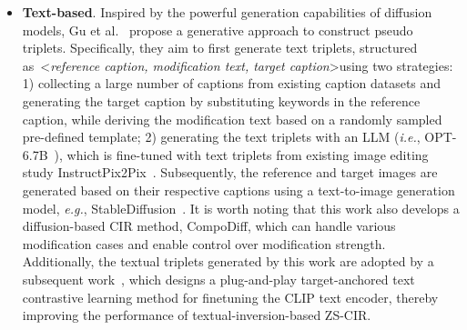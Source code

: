 \begin{itemize}
Instead of relying on visual similarity, MagicLens~\cite{zhang2024magiclens} extracts potential reference-target image pairs by mining images from the same webpage, where implicit relationships often exist. It annotates each image with detailed descriptions, including Alt-texts\footnote{https://en.wikipedia.org/wiki/Alt_attribute}, image content annotation (ICA) labels\footnote{https://cloud.google.com/vision/docs/labels}, and captions generated by a large multimodal model, PaLI~\cite{chen2023pali}. Finally, PaLM2~\cite{anil2023palm} is used to generate open-ended modification text for each image pair based on their detailed descriptions. To ensure the generated modification text is logical, techniques such as instruction-following~\cite{chung2024scaling}, few-shot demonstrations~\cite{brown2020language}, and chain-of-thought prompting~\cite{wei2022chain} are employed.
\item \textbf{Text-based}. Inspired by the powerful generation capabilities of diffusion models, Gu et al.~\cite{compodiff} propose a generative approach to construct pseudo triplets. Specifically, they aim to first generate text triplets, structured as~\textless \emph{reference caption, modification text, target caption}\textgreater using two strategies: 1) collecting a large number of captions from existing caption datasets and generating the target caption by substituting keywords in the reference caption, while deriving the modification text based on a randomly sampled pre-defined template; 2) generating the text triplets with an LLM (\textit{i.e.}, OPT-6.7B~\cite{zhang2022opt}), which is fine-tuned with text triplets from existing image editing study InstructPix2Pix~\cite{brooks2023instructpix2pix}. Subsequently, the reference and target images are generated based on their respective captions using a text-to-image generation model, \textit{e.g.}, StableDiffusion~\cite{rombach2022high}. It is worth noting that this work also develops a diffusion-based CIR method, CompoDiff, which can handle various modification cases and enable control over modification strength. Additionally, the textual triplets generated by this work are adopted by a subsequent work~\cite{rtd}, which designs a plug-and-play target-anchored text contrastive learning method for finetuning the CLIP text encoder, thereby improving the performance of textual-inversion-based ZS-CIR.
\end{itemize}


